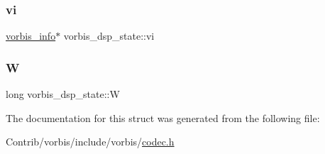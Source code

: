 \subsubsection{\texorpdfstring{vi}{vi}}
{\footnotesize\ttfamily \mbox{\hyperlink{structvorbis__info}{vorbis\+\_\+info}}$\ast$ vorbis\+\_\+dsp\+\_\+state\+::vi}

\mbox{\label{structvorbis__dsp__state_a1cc3a520dcf831fb967341e5095c7b38}} 
\subsubsection{\texorpdfstring{W}{W}}
{\footnotesize\ttfamily long vorbis\+\_\+dsp\+\_\+state\+::W}



The documentation for this struct was generated from the following file\+:\begin{DoxyCompactItemize}
\item 
Contrib/vorbis/include/vorbis/\mbox{\hyperlink{codec_8h}{codec.\+h}}\end{DoxyCompactItemize}
